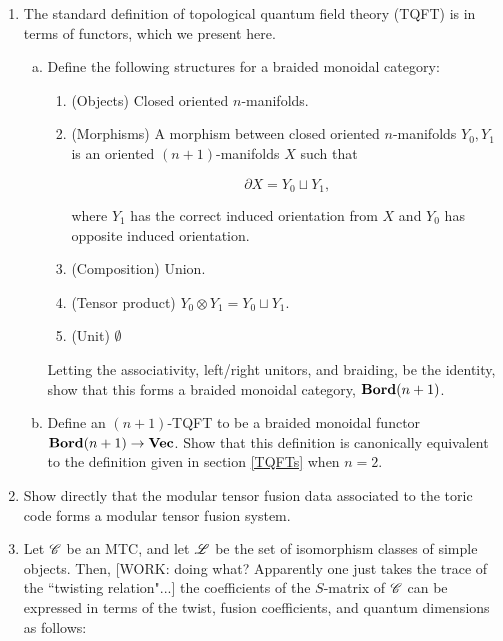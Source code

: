 \documentclass{article}
\theoremstyle{definition}
\numberwithin{figure}{section}
\begin{document}
\begin{enumerate}[\thesection .1.]
\item The standard definition of topological quantum field theory (TQFT) is in terms of functors, which we present here.

\begin{enumerate}[(a)]
\item Define the following structures for a braided monoidal category:

\begin{enumerate}
\item (Objects) Closed oriented $n$-manifolds.

\item (Morphisms) A morphism between closed oriented $n$-manifolds $Y_0,Y_1$ is an oriented $(n+1)$-manifolds $X$ such that

$$\partial X = Y_0\sqcup Y_1,$$

where $Y_1$ has the correct induced orientation from $X$ and $Y_0$ has opposite induced orientation. 

\item (Composition) Union.

\item (Tensor product) $Y_0\otimes Y_1 = Y_0\sqcup Y_1$.

\item (Unit) $\emptyset$
\end{enumerate}

Letting the associativity, left/right unitors, and braiding, be the identity, show that this forms a braided monoidal category, $\bold{Bord}(n+1)$.

\item Define an $(n+1)$-TQFT to be a braided monoidal functor $\bold{Bord}(n+1)\to \bold{Vec}$. Show that this definition is canonically equivalent to the definition given in section \ref{TQFTs} when $n=2$.
\end{enumerate}

\item Show directly that the modular tensor fusion data associated to the toric code forms a modular tensor fusion system.

\item Let $\mathscr{C}$ be an MTC, and let $\mathscr{L}$ be the set of isomorphism classes of simple objects. Then, [WORK: doing what? Apparently one just takes the trace of the ``twisting relation"...] the coefficients of the $S$-matrix of $\mathscr{C}$ can be expressed in terms of the twist, fusion coefficients, and quantum dimensions as follows:


\end{enumerate}
\end{document}
